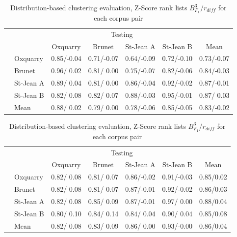 \begin{table}[H]
  \centering
  \caption{Distribution-based clustering evaluation, Z-Score rank lists $B^{3}_{F_1}$/$r_{diff}$ for each corpus pair}
  \label{tab:distribution-based_clustering_zscore}

  \vspace{0.5cm}

  \begin{tabular}{l l| c c c c|c}
    \toprule
    \multicolumn{2}{c}{\multirow{2}{*}{}} & \multicolumn{4}{c}{Testing} \\
    \multicolumn{2}{c}{} & Oxquarry & Brunet & St-Jean A & St-Jean B & Mean \\
    \midrule
    \parbox[!t]{2mm}{}
    & Oxquarry  & 0.85/-0.04 & 0.71/-0.07 & 0.64/-0.09 & 0.72/-0.10 & 0.73/-0.07 \\
    & Brunet    & 0.96/ 0.02 & 0.81/ 0.00 & 0.75/-0.07 & 0.82/-0.06 & 0.84/-0.03 \\
    & St-Jean A & 0.89/ 0.04 & 0.81/ 0.00 & 0.86/-0.04 & 0.92/-0.02 & 0.87/-0.01 \\
    & St-Jean B & 0.82/ 0.08 & 0.82/ 0.07 & 0.88/-0.03 & 0.95/-0.01 & 0.87/ 0.03 \\
    \midrule
    & Mean      & 0.88/ 0.02 & 0.79/ 0.00 & 0.78/-0.06 & 0.85/-0.05 & 0.83/-0.02 \\
    \bottomrule
  \end{tabular}

  \vspace{0.5cm}

  \begin{tabular}{l l| c c c c|c}
    \toprule
    \multicolumn{2}{c}{\multirow{2}{*}{}} & \multicolumn{4}{c}{Testing} \\
    \multicolumn{2}{c}{} & Oxquarry & Brunet & St-Jean A & St-Jean B & Mean \\
    \midrule
    \parbox[!t]{2mm}{}
    & Oxquarry  & 0.82/ 0.08 & 0.81/ 0.07 & 0.86/-0.02 & 0.91/-0.03 & 0.85/0.02\\
    & Brunet    & 0.82/ 0.08 & 0.81/ 0.07 & 0.87/-0.01 & 0.92/-0.02 & 0.86/0.03\\
    & St-Jean A & 0.82/ 0.08 & 0.85/ 0.09 & 0.87/-0.01 & 0.97/ 0.00 & 0.88/0.04\\
    & St-Jean B & 0.80/ 0.10 & 0.84/ 0.14 & 0.84/ 0.04 & 0.90/ 0.04 & 0.85/0.08\\
    \midrule
    & Mean      & 0.82/ 0.08 & 0.83/ 0.09 & 0.86/ 0.00 & 0.93/-0.00 & 0.86/0.04\\
    \bottomrule
  \end{tabular}

\end{table}

